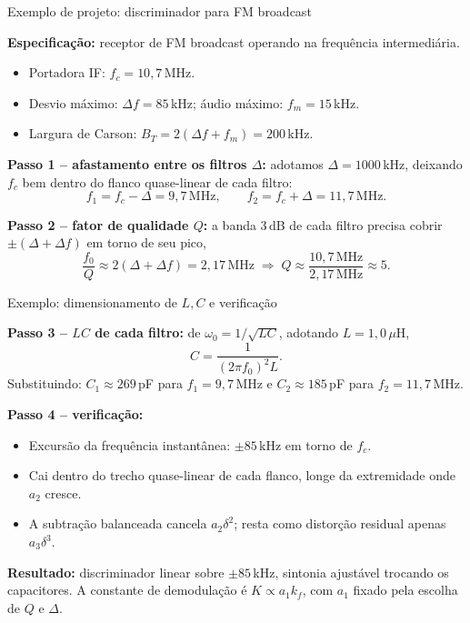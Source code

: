 \begin{frame}{Exemplo de projeto: discriminador para FM broadcast}

\footnotesize
\textbf{Especificação:} receptor de FM broadcast operando na frequência intermediária.
\begin{itemize}\itemsep0pt
\item Portadora IF: $f_c = 10{,}7$\,MHz.
\item Desvio máximo: $\Delta f = 85$\,kHz; áudio máximo: $f_m = 15$\,kHz.
\item Largura de Carson: $B_T = 2(\Delta f + f_m) = 200$\,kHz.
\end{itemize}

\pause
\vspace{0.15cm}
\textbf{Passo 1 -- afastamento entre os filtros $\Delta$:} adotamos $\Delta = 1000$\,kHz, deixando $f_c$ bem dentro do flanco quase-linear de cada filtro:
\[
f_1 = f_c - \Delta = 9{,}7\,\text{MHz}, \qquad f_2 = f_c + \Delta = 11{,}7\,\text{MHz}.
\]

\pause
\vspace{0.1cm}
\textbf{Passo 2 -- fator de qualidade $Q$:} a banda 3\,dB de cada filtro precisa cobrir $\pm(\Delta + \Delta f)$ em torno de seu pico,
\[
\frac{f_0}{Q} \approx 2(\Delta + \Delta f) = 2{,}17\,\text{MHz}
\;\Longrightarrow\; Q \approx \frac{10{,}7\,\text{MHz}}{2{,}17\,\text{MHz}} \approx 5.
\]

\end{frame}


\begin{frame}{Exemplo: dimensionamento de $L, C$ e verificação}

\footnotesize
\textbf{Passo 3 -- $LC$ de cada filtro:} de $\omega_0 = 1/\sqrt{LC}$, adotando $L = 1{,}0\,\mu\text{H}$,
\[
C = \frac{1}{(2\pi f_0)^2 L}.
\]
Substituindo: $C_1 \approx 269$\,pF para $f_1 = 9{,}7$\,MHz e $C_2 \approx 185$\,pF para $f_2 = 11{,}7$\,MHz.

\pause
\vspace{0.15cm}
\textbf{Passo 4 -- verificação:}
\begin{itemize}\itemsep0pt
\item Excursão da frequência instantânea: $\pm 85$\,kHz em torno de $f_c$.
\item Cai dentro do trecho quase-linear de cada flanco, longe da extremidade onde $a_2$ cresce.
\item A subtração balanceada cancela $a_2\delta^2$; resta como distorção residual apenas $a_3\delta^3$.
\end{itemize}

\pause
\vspace{0.1cm}
\textbf{Resultado:} discriminador linear sobre $\pm 85$\,kHz, sintonia ajustável trocando os capacitores. A constante de demodulação é $K \propto a_1 k_f$, com $a_1$ fixado pela escolha de $Q$ e $\Delta$.

\end{frame}

